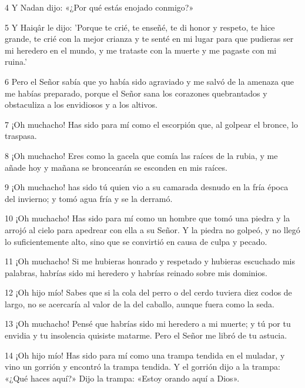 \par 4 Y Nadan dijo: «¿Por qué estás enojado conmigo?»

\par 5 Y Haiqâr le dijo: 'Porque te crié, te enseñé, te di honor y respeto, te hice grande, te crié con la mejor crianza y te senté en mi lugar para que pudieras ser mi heredero en el mundo, y me trataste con la muerte y me pagaste con mi ruina.'

\par 6 Pero el Señor sabía que yo había sido agraviado y me salvó de la amenaza que me habías preparado, porque el Señor sana los corazones quebrantados y obstaculiza a los envidiosos y a los altivos.

\par 7 ¡Oh muchacho! Has sido para mí como el escorpión que, al golpear el bronce, lo traspasa.

\par 8 ¡Oh muchacho! Eres como la gacela que comía las raíces de la rubia, y me añade hoy y mañana se broncearán se esconden en mis raíces.

\par 9 ¡Oh muchacho! has sido tú quien vio a su camarada desnudo en la fría época del invierno; y tomó agua fría y se la derramó.

\par 10 ¡Oh muchacho! Has sido para mí como un hombre que tomó una piedra y la arrojó al cielo para apedrear con ella a su Señor. Y la piedra no golpeó, y no llegó lo suficientemente alto, sino que se convirtió en causa de culpa y pecado.

\par 11 ¡Oh muchacho! Si me hubieras honrado y respetado y hubieras escuchado mis palabras, habrías sido mi heredero y habrías reinado sobre mis dominios.

\par 12 ¡Oh hijo mío! Sabes que si la cola del perro o del cerdo tuviera diez codos de largo, no se acercaría al valor de la del caballo, aunque fuera como la seda.

\par 13 ¡Oh muchacho! Pensé que habrías sido mi heredero a mi muerte; y tú por tu envidia y tu insolencia quisiste matarme. Pero el Señor me libró de tu astucia.

\par 14 ¡Oh hijo mío! Has sido para mí como una trampa tendida en el muladar, y vino un gorrión y encontró la trampa tendida. Y el gorrión dijo a la trampa: «¿Qué haces aquí?» Dijo la trampa: «Estoy orando aquí a Dios».

